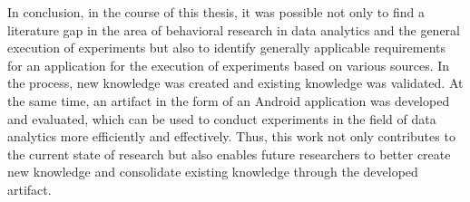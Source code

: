 In conclusion, in the course of this thesis, it was possible not only to find a literature gap in the area of behavioral research in data analytics and the general execution of experiments but also to identify generally applicable requirements for an application for the execution of experiments based on various sources. In the process, new knowledge was created and existing knowledge was validated. At the same time, an artifact in the form of an Android application was developed and evaluated, which can be used to conduct experiments in the field of data analytics more efficiently and effectively. Thus, this work not only contributes to the current state of research but also enables future researchers to better create new knowledge and consolidate existing knowledge through the developed artifact.
